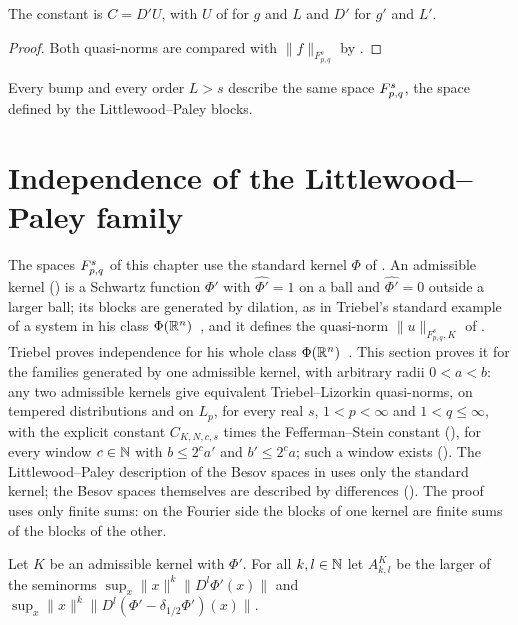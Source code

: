 The constant is $C = D' U$, with $U$ of  for $g$ and $L$ and $D'$ for
$g'$ and $L'$.

\begin{proof}
\leanok
Both quasi-norms are compared with $\|f\|_{F^s_{p,q}}$ by .
\end{proof}

Every bump and every order $L > s$ describe the same space $F^{s}_{p,q}$, the space defined by
the Littlewood--Paley blocks.

\section{Independence of the Littlewood--Paley family}
\label{sec:lp-family-independence}

The spaces $F^{s}_{p,q}$ of this chapter use the standard kernel $\Phi$ of
. An admissible kernel () is a Schwartz
function $\Phi'$ with $\widehat{\Phi'} = 1$ on a ball and $\widehat{\Phi'} = 0$ outside a larger
ball; its blocks are generated by dilation, as in Triebel's standard example of a system in his
class $\Phi(\mathbb{R}^n)$~\cite[Section~2.3.1]{Triebel}, and it defines the quasi-norm
$\|u\|_{F^s_{p,q}, K}$ of . Triebel proves independence for his whole class
$\Phi(\mathbb{R}^n)$~\cite[Section~2.3.2]{Triebel}. This section proves it for the families generated by
one admissible kernel, with arbitrary radii $0 < a < b$: any two admissible kernels give
equivalent Triebel--Lizorkin quasi-norms, on tempered distributions and on $L_p$, for every real
$s$, $1 < p < \infty$ and $1 < q \leq \infty$, with the explicit constant $C_{K,N,c,s}$ times the
Fefferman--Stein constant (), for every window $c \in \mathbb{N}$
with $b \leq 2^c a'$ and $b' \leq 2^c a$; such a window exists
(). The Littlewood--Paley description of the Besov spaces in
 uses only the standard kernel; the Besov spaces themselves are described by
differences (). The proof uses only finite sums: on the Fourier side the
blocks of one kernel are finite sums of the blocks of the other.

\begin{definition}
\label{def:lp-kernel-base-bound}
\leanok
{}
Let $K$ be an admissible kernel with $\Phi'$. For all $k, l \in \mathbb{N}$ let $A^{K}_{k,l}$ be the
larger of the seminorms $\sup_x \|x\|^k \|D^l \Phi'(x)\|$ and
$\sup_x \|x\|^k \|D^l (\Phi' - \delta_{1/2} \Phi')(x)\|$.
\end{definition}

